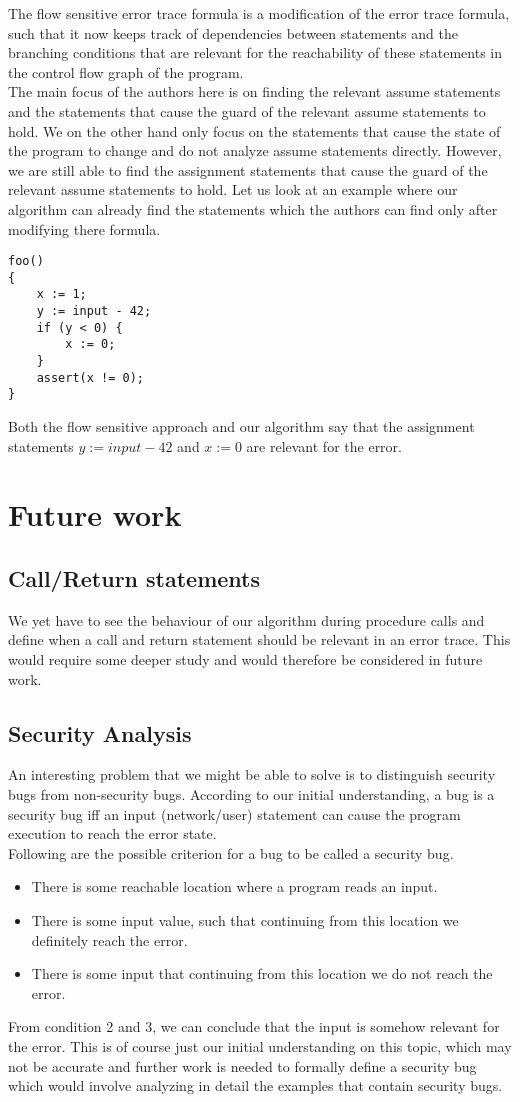 \documentclass{article}
\begin{document}
The flow sensitive error trace formula is a modification of the error trace formula, such that it now keeps track of dependencies between statements and the branching conditions that are relevant for the reachability of these statements in the control flow graph of the program. \\
The main focus of the authors here is on finding the relevant assume statements and the statements that cause the guard of the relevant assume statements to hold. We on the other hand only focus on the statements that cause the state of the program to change and do not analyze assume statements directly. However, we are still able to find the assignment statements that cause the guard of the relevant assume statements to hold. Let us look at an example where our algorithm can already find the statements which the authors can find only after modifying there formula. 
\begin{lstlisting}
foo()
{
	x := 1;
	y := input - 42;
	if (y < 0) {
		x := 0;	
	}
	assert(x != 0);
}
\end{lstlisting}
Both the flow sensitive approach and our algorithm say that the assignment statements $y := input - 42$ and $x := 0$ are relevant for the error.
\section{Future work}
\subsection{Call/Return statements}
We yet have to see the behaviour of our algorithm during procedure calls and define when a call and return statement should be relevant in an error trace. This would require some deeper study and would therefore be considered in future work.
\subsection{Security Analysis}
An interesting problem that we might be able to solve is to distinguish security bugs from non-security bugs. According to our initial understanding, a bug is a security bug iff an input (network/user) statement can cause the program execution to reach the error state. \\
Following are the possible criterion for a bug to be called a security bug.
\begin{itemize}
  \item There  is some reachable location where a program reads an input.
  \item There is some input value, such that continuing from this location we definitely reach the error.
  \item There is some input that continuing from this location we do not reach the error.
\end{itemize}
From condition 2 and 3, we can conclude that the input is somehow relevant for the error. This is of course just our initial understanding on this topic, which may not be accurate and further work is needed to formally define a security bug which would involve analyzing in detail the examples that contain security bugs.
\newpage
\end{document}
